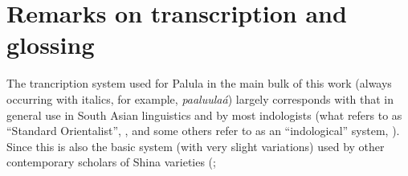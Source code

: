 

\section{Remarks on transcription and glossing}
\label{sec:1-7}

The trancription system used for Palula in the main bulk of this work (always occurring with
italics, for example, \textit{paaluulaá}) largely corresponds with that in general use in South Asian
linguistics and by most indologists (what \citeauthor{masica1991} refers to as ``Standard
Orientalist'', \citeyear[xv]{masica1991}, and some others refer to as an ``indological'' system,
\citealt[9]{radloff1999}). Since this is also the basic system (with very slight variations) used by other contemporary
scholars of Shina varieties
(\citealt{buddruss1987,buddruss1993,buddruss1996,degener2008,schmidtkohistani2001,schmidtkohistani2008,schmidt2000,schmidt2001,schmidt2003,schmidt2004,schmidt2004b, radloff1992,radloff1999};
